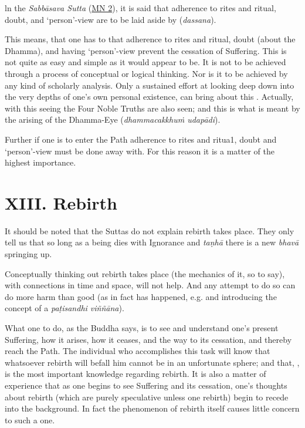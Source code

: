 ln the \emph{Sabbāsava Sutta} (\href{https://suttacentral.net/mn2/en/bodhi}{MN 2}), it is said that adherence to rites and ritual, doubt, and `person'-view are to be laid aside by  (\emph{dassana}).

This means, that one has to  that adherence to rites and ritual, doubt (about the Dhamma), and having `person'-view prevent the cessation of Suffering. This  is not quite as easy and simple as it would appear to be. It is not to be achieved through a process of conceptual or logical thinking. Nor is it to be achieved by any kind of scholarly analysis. Only a sustained effort at looking deep down into the very depths of one's own personal existence, can bring about this . Actually, with this seeing the Four Noble Truths are also seen; and this is what is meant by the arising of the Dhamma-Eye (\emph{dhammacakkhuṁ udapādi}).

Further if one is to enter the Path adherence to rites and ritua1, doubt and `person'-view must be done away with. For this reason it is a matter of the highest importance.

\hypertarget{_xiii_rebirth}{%
\section{XIII. Rebirth}\label{_xiii_rebirth}}

It should be noted that the Suttas do not explain  rebirth takes place. They only tell us that so long as a being dies with Ignorance and \emph{taṇhā} there is a new \emph{bhavā} springing up.

Conceptually thinking out  rebirth takes place (the mechanics of it, so to say), with connections in time and space, will not help. And any attempt to do so can do more harm than good (as in fact has happened, e.g.  and introducing the concept of a \emph{paṭisandhi viññāna}).

What one  to do, as the Buddha says, is to see and understand one's present Suffering, how it arises, how it ceases, and the way to its cessation, and thereby reach the Path. The individual who accomplishes this task will know that whatsoever rebirth will befall him cannot be in an unfortunate sphere; and that, , is the most important knowledge regarding rebirth. It is also a matter of experience that as one begins to see Suffering and its cessation, one's thoughts about rebirth (which are purely speculative unless one  rebirth) begin to recede into the background. In fact the phenomenon of rebirth itself causes little concern to such a one.

